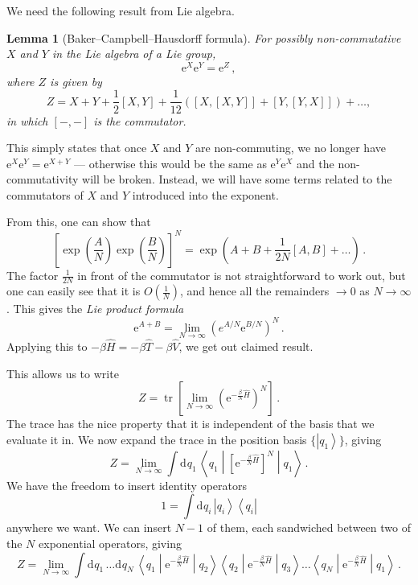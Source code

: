 \documentclass{article}
\theoremstyle{plain}\theoremheaderfont{\normalfont\itshape}\theorembodyfont{\rmfamily}\theoremseparator{.}\newtheorem*{rem}{Remark}\newtheorem*{ex}{Example}\newtheorem*{proof}{Proof}\newtheorem*{altp}{Alternative proof}
\theoremstyle{plain}\theoremheaderfont{\normalfont\bfseries}\theorembodyfont{\rmfamily}\theoremseparator{.}\newtheorem{thm}{Theorem}[section]\newtheorem{lem}[thm]{Lemma}\newtheorem{prop}[thm]{Proposition}\newtheorem*{cor}{Corollary}\newtheorem{defn}[thm]{Definition}\newtheorem{clm}[thm]{Claim}\newtheorem{clminproof}{Claim}
\theoremstyle{break}\theoremheaderfont{\normalfont\itshape}\theorembodyfont{\rmfamily}\theoremseparator{.\medskip}\newtheorem*{proofskip}{Proof}\newtheorem*{exs}{Examples}\newtheorem*{rems}{Remarks}
\theoremstyle{break}\theoremheaderfont{\normalfont\bfseries}\theorembodyfont{\rmfamily}\theoremseparator{.\medskip}\newtheorem{lemskip}[thm]{Lemma}\newtheorem{defnskip}[thm]{Definition}\newtheorem{propskip}[thm]{Proposition}\newtheorem{thmskip}[thm]{Theorem}
\numberwithin{equation}{section}
\newcommand{\ee}{\mathrm{e}}
\newcommand{\dd}[2][]{\mathrm{d}^{#1} #2\,}
\newcommand{\bra}[1]{\left\langle #1 \right|}
\newcommand{\ket}[1]{\left| #1 \right\rangle}
\newcommand{\mel}[3]{\left\langle #1 \middle| #2 \middle| #3 \right\rangle}
\newcommand{\expval}[2]{\left\langle #2 \middle| #1 \middle| #2 \right\rangle}
\DeclareMathOperator{\tr}{tr}
\begin{document}
    We need the following result from Lie algebra.
    \begin{lem}[Baker--Campbell--Hausdorff formula]
        For possibly non-commutative \(X\) and \(Y\) in the Lie algebra of a Lie group,
        \begin{equation}
            \ee^{X}\ee^{Y}=\ee^{Z}\,,
        \end{equation}
        where \(Z\) is given by
        \begin{equation}
            Z=X+Y+\frac{1}{2}[X,Y]+\frac{1}{12}([X,[X,Y]]+[Y,[Y,X]])+\dots,
        \end{equation}
        in which \([-,-]\) is the commutator.
    \end{lem}
    This simply states that once \(X\) and \(Y\) are non-commuting, we no longer have \(\ee^{X}\ee^{Y}=\ee^{X+Y}\) --- otherwise this would be the same as \(\ee^{Y}\ee^{X}\) and the non-commutativity will be broken. Instead, we will have some terms related to the commutators of \(X\) and \(Y\) introduced into the exponent.
    
    From this, one can show that
    \begin{equation}
        \left[\exp\left(\frac{A}{N}\right)\exp\left(\frac{B}{N}\right)\right]^N = \exp\left(A+B+\frac{1}{2N}[A,B]+\dots\right)\,.
    \end{equation}
    The factor \(\frac{1}{2N}\) in front of the commutator is not straightforward to work out, but one can easily see that it is \(O(\frac{1}{N})\), and hence all the remainders \(\to 0\) as \(N\to\infty\). This gives the \textit{Lie product formula}
    \begin{equation}
        \ee^{A+B}=\lim_{N\to\infty}\left(e^{A/N}\ee^{B/N}\right)^N\,.
    \end{equation}
    Applying this to \(-\beta\hat{H}=-\beta\hat{T}-\beta\hat{V}\), we get out claimed result.

    This allows us to write
    \begin{equation}
        Z=\tr\left[\lim_{N\to\infty}\left(\ee^{-\frac{\beta}{N}\hat{H}}\right)^N\right]\,.
    \end{equation}
    The trace has the nice property that it is independent of the basis that we evaluate it in. We now expand the trace in the position basis \(\{\ket{q_1}\}\), giving
    \begin{equation}
        Z=\lim_{N\to\infty}\int\dd{q_1}\expval{\left[\ee^{-\frac{\beta}{N}\hat{H}}\right]^N}{q_1}\,.
    \end{equation}
    We have the freedom to insert identity operators
    \begin{equation}
        1=\int\dd{q_i}\ket{q_i}\bra{q_i}
    \end{equation}
    anywhere we want. We can insert \(N-1\) of them, each sandwiched between two of the \(N\) exponential operators, giving
    \begin{equation}
        Z=\lim_{N\to\infty}\int\dd{q_1}\dots\dd{q_N}\mel{q_1}{\ee^{-\frac{\beta}{N}\hat{H}}}{q_2}\mel{q_2}{\ee^{-\frac{\beta}{N}\hat{H}}}{q_3}\dots\mel{q_N}{\ee^{-\frac{\beta}{N}\hat{H}}}{q_1}\,.
    \end{equation}
\end{document}
